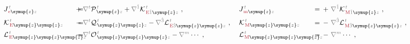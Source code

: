 \begin{subequations} \label{eq:multipole-JKL}
\begin{align}
	&{J}^{\;\!\mathcolor{gray}{t}}_{\;\!\textcolor{Maroon}{\text{e}} \symup{z} \mathcolor{gray}{z}} \hspace{-2.5em}&&=\hspace{0.2em} &&\hspace{-2.5em}+ \mathcolor{gray}{\nabla^t} {\mathcal{P}}^{\;\!\mathcolor{gray}{t}}_{\;\! \symup{z} \mathcolor{gray}{z}} + \mathcolor{gray}{\nabla^{\hat{1}}} {\mathcal{K}}^{\;\!\mathcolor{gray}{t}}_{\;\!\textcolor{Maroon}{\text{E}} \mathcolor{gray}{\hat{1}} \symup{z}\mathcolor{gray}{z}}~, &&\hspace{0.3em} {J}^{\;\!\mathcolor{gray}{t}}_{\;\!\textcolor{Maroon}{\text{m}} \symup{z} \mathcolor{gray}{z}} \hspace{-2.5em}&&=\hspace{0.2em} +~ \mathcolor{gray}{\nabla^{\hat{1}}} {\mathcal{K}}^{\;\!\mathcolor{gray}{t}}_{\;\!\textcolor{Maroon}{\text{M}} \mathcolor{gray}{\hat{1}} \symup{z} \mathcolor{gray}{z}}~, \label{eq:Je-JM} \\
	&{\mathcal{K}}^{\;\!\mathcolor{gray}{t}}_{\;\!\textcolor{Maroon}{\text{E}} \symup{z}\symup{z} \mathcolor{gray}{z}} \hspace{-2.5em}&&=\hspace{0.2em} &&\hspace{-2.5em}- \mathcolor{gray}{\nabla^t} {\mathcal{Q}}^{\;\!\mathcolor{gray}{t}}_{\;\! \symup{z}\symup{z} \mathcolor{gray}{z}} - \mathcolor{gray}{\nabla^{\hat{3}}} {\mathcal{L}}^{\;\!\mathcolor{gray}{t}}_{\;\!\textcolor{Maroon}{\text{E}} \mathcolor{gray}{\hat{3}} \symup{z}\symup{z}\mathcolor{gray}{z}}~, &&\hspace{0.3em} {\mathcal{K}}^{\;\!\mathcolor{gray}{t}}_{\;\!\textcolor{Maroon}{\text{M}} \symup{z}\symup{z} \mathcolor{gray}{z}} \hspace{-2.5em}&&=\hspace{0.2em} -~ \mathcolor{gray}{\nabla^{\hat{3}}} {\mathcal{L}}^{\;\!\mathcolor{gray}{t}}_{\;\!\textcolor{Maroon}{\text{M}} \mathcolor{gray}{\hat{3}} \symup{z} \symup{z} \mathcolor{gray}{z}}~, \label{eq:Ke-KM} \\
	&{\mathcal{L}}^{\;\!\mathcolor{gray}{t}}_{\;\!\textcolor{Maroon}{\text{E}} \symup{z}\symup{z}\symup{z} \mathcolor{gray}{z}} \hspace{-2.5em}&&=\hspace{0.2em} &&\hspace{-2.5em}- \mathcolor{gray}{\nabla^t} {\mathcal{O}}^{\;\!\mathcolor{gray}{t}}_{\;\! \symup{z}\symup{z}\symup{z} \mathcolor{gray}{z}} - \mathcolor{gray}{\nabla^m} \cdots~, &&\hspace{0.3em} {\mathcal{L}}^{\;\!\mathcolor{gray}{t}}_{\;\!\textcolor{Maroon}{\text{M}} \symup{z}\symup{z}\symup{z} \mathcolor{gray}{z}} \hspace{-2.5em}&&=\hspace{0.2em} -~ \mathcolor{gray}{\nabla^m} \cdots~, \label{eq:Le-LM}
\end{align}
\end{subequations}
